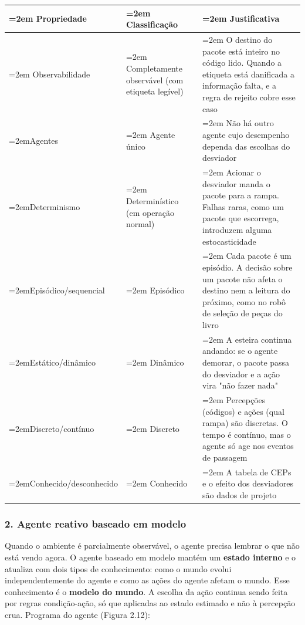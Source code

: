 \documentclass[12pt, a4paper]{article}
\begin{document}
\begingroup
\setlength{\tabcolsep}{4.0pt}
\begin{longtable}{@{}>{\raggedright\hyphenpenalty=30\tolerance=999\emergencystretch=2em\arraybackslash}p{4.51cm}>{\raggedright\hyphenpenalty=30\tolerance=999\emergencystretch=2em\arraybackslash}p{3.25cm}>{\raggedright\hyphenpenalty=30\tolerance=999\emergencystretch=2em\arraybackslash}p{6.96cm}@{}}
\toprule\noalign{}
Propriedade & Clas\-si\-fi\-ca\-ção & Justificativa \\
\midrule\noalign{}
\endhead
\bottomrule\noalign{}
\endlastfoot
Observabilidade & Completamente ob\-ser\-vá\-vel (com etiqueta legível\allowbreak ) & O destino do pacote está inteiro no código lido. Quando a etiqueta está danificada a in\-for\-ma\-ção falta, e a regra de rejeito cobre esse caso \\
Agentes & Agente único & Não há outro agente cujo desempenho dependa das escolhas do desviador \\
Determinismo & De\-ter\-mi\-nís\-tico (em operação normal\allowbreak ) & Acionar o desviador manda o pacote para a rampa. Falhas raras, como um pacote que escorrega, introduzem alguma estocasticidade \\
Episódico\slash sequencial & Episódico & Cada pacote é um episódio. A decisão sobre um pacote não afeta o destino nem a leitura do próximo, como no robô de seleção de peças do livro \\
Estático\slash dinâmico & Dinâmico & A esteira continua andando: se o agente demorar, o pacote passa do desviador e a ação vira "não fazer nada" \\
Discreto\slash contínuo & Discreto & Per\-cep\-ções (códigos\allowbreak ) e ações (qual rampa\allowbreak ) são discretas. O tempo é contínuo, mas o agente só age nos eventos de passagem \\
Conhecido\slash desconhecido & Conhecido & A tabela de CEPs e o efeito dos desviadores são dados de projeto \\
\end{longtable}
\endgroup

\subsubsection{2. Agente reativo baseado em modelo}\label{2-agente-reativo-baseado-em-modelo}

Quando o ambiente é parcialmente observável, o agente precisa lembrar o que não está vendo agora. O agente baseado em modelo mantém um \textbf{estado interno} e o atualiza com dois tipos de conhecimento: como o mundo evolui independentemente do agente e como as ações do agente afetam o mundo. Esse conhecimento é o \textbf{modelo do mundo}. A escolha da ação continua sendo feita por regras condição-ação, só que aplicadas ao estado estimado e não à percepção crua. Programa do agente (Figura 2.12):
\end{document}
